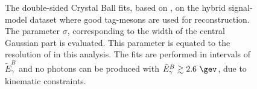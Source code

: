\begin{figure}[htbp!]
{    }

    \caption{\label{fig:resolution_fits} The double-sided Crystal Ball fits, based on ,
    on the hybrid signal-model dataset where good tag-\B mesons are used for \EB reconstruction.
    The parameter $\sigma$, corresponding to the width of the central Gaussian part is evaluated.
    This parameter is equated to the resolution of \EB in this analysis.
    The fits are performed in intervals of $\tilde{E}_{\gamma}^B$ and no \BtoXsgamma photons can be produced with $\tilde{E}_{\gamma}^B\gtrsim 2.6~\gev$, due to kinematic constraints.
    }
\end{figure}

